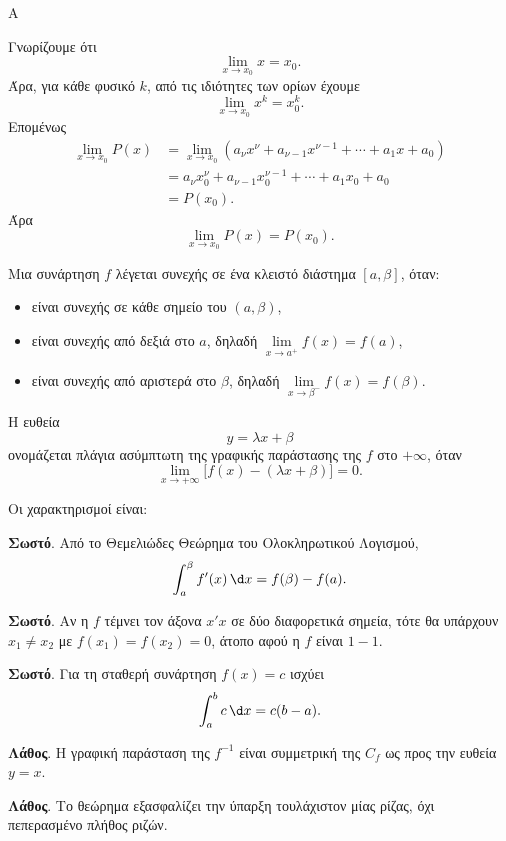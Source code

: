 \begin{thema}{Α}
\begin{erwthma}
\item Γνωρίζουμε ότι
\[
\lim_{x\to x_0}x=x_0.
\]
Άρα, για κάθε φυσικό $k$, από τις ιδιότητες των ορίων έχουμε
\[
\lim_{x\to x_0}x^k=x_0^k.
\]
Επομένως
\begin{align*}
\lim_{x\to x_0}P(x)
&=\lim_{x\to x_0}\left(a_\nu x^\nu+a_{\nu-1}x^{\nu-1}+\cdots+a_1x+a_0\right)\\
&=a_\nu x_0^\nu+a_{\nu-1}x_0^{\nu-1}+\cdots+a_1x_0+a_0\\
&=P(x_0).
\end{align*}
Άρα
\[
{\lim_{x\to x_0}P(x)=P(x_0)}.
\]

\item Μια συνάρτηση $f$ λέγεται συνεχής σε ένα κλειστό διάστημα $[a,\beta]$, όταν:
\begin{itemize}
\item είναι συνεχής σε κάθε σημείο του $(a,\beta)$,
\item είναι συνεχής από δεξιά στο $a$, δηλαδή $\lim\limits_{x\to a^+}f(x)=f(a)$,
\item είναι συνεχής από αριστερά στο $\beta$, δηλαδή $\lim\limits_{x\to \beta^-}f(x)=f(\beta)$.
\end{itemize}

\item Η ευθεία
\[
y=\lambda x+\beta
\]
ονομάζεται πλάγια ασύμπτωτη της γραφικής παράστασης της $f$ στο $+\infty$, όταν
\[
\lim_{x\to+\infty}\bigl[f(x)-(\lambda x+\beta)\bigr]=0.
\]

\item Οι χαρακτηρισμοί είναι:
\begin{alist}
\item \textbf{Σωστό}. Από το Θεμελιώδες Θεώρημα του Ολοκληρωτικού Λογισμού,
\[
\dint_a^\beta f'(x)\,\d x=f(\beta)-f(a).
\]
\item \textbf{Σωστό}. Αν η $f$ τέμνει τον άξονα $x'x$ σε δύο διαφορετικά σημεία, τότε θα υπάρχουν $x_1\neq x_2$ με $f(x_1)=f(x_2)=0$, άτοπο αφού η $f$ είναι $1-1$.
\item \textbf{Σωστό}. Για τη σταθερή συνάρτηση $f(x)=c$ ισχύει
\[
\dint_a^b c\,\d x=c(b-a).
\]
\item \textbf{Λάθος}. Η γραφική παράσταση της $f^{-1}$ είναι συμμετρική της $C_f$ ως προς την ευθεία $y=x$.
\item \textbf{Λάθος}. Το θεώρημα  εξασφαλίζει την ύπαρξη τουλάχιστον μίας ρίζας, όχι πεπερασμένο πλήθος ριζών.
\end{alist}
\end{erwthma}
\end{thema}

